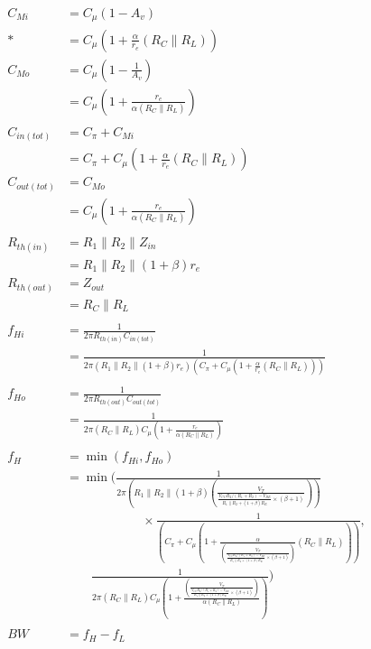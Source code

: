 \documentclass[11pt, a4paper]{article}
\begin{document}
\begin{align*}
C_{Mi} &= C_\mu (1 - A_v)\\*
&= C_\mu \left(1 + \frac{\alpha}{r_e}(R_C \parallel R_L)\right)\\
C_{Mo} &= C_\mu \left(1 - \frac{1}{A_v}\right)\\
&= C_\mu \left(1 + \frac{r_e}{\alpha(R_C \parallel R_L)}\right)\\ \\
C_{in(tot)} &= C_\pi + C_{Mi}\\
&= C_\pi + C_\mu \left(1 + \frac{\alpha}{r_e}(R_C \parallel R_L)\right)\\
C_{out(tot)} &= C_{Mo}\\
&= C_\mu \left(1 + \frac{r_e}{\alpha(R_C \parallel R_L)}\right)\\ \\
R_{th(in)} &= R_1 \parallel R_2 \parallel Z_{in}\\
&= R_1 \parallel R_2 \parallel (1+\beta)r_e\\
R_{th(out)} &= Z_{out}\\
&= R_C \parallel R_L\\ \\
f_{Hi} &= \frac{1}{2\pi R_{th(in)} C_{in(tot)}}\\
&= \frac{1}{2\pi (R_1 \parallel R_2 \parallel (1+\beta)r_e) \left(C_\pi + C_\mu \left(1 + \frac{\alpha}{r_e}(R_C \parallel R_L)\right)\right)}\\ \\
f_{Ho} &= \frac{1}{2\pi R_{th(out)} C_{out(tot)}}\\
&= \frac{1}{2\pi (R_C \parallel R_L) C_\mu \left(1 + \frac{r_e}{\alpha(R_C \parallel R_L)}\right)}\\ \\
f_H &= \min(f_{Hi}, f_{Ho})\\
&= \min\Bigg(
    \frac{1}{2\pi (R_1 \parallel R_2 \parallel (1+\beta)(\frac{V_T}{\frac{V_{CC}R_2/(R_1+R_2)-V_{BE}}{R_1 \parallel R_2 + (1+\beta)R_E} \times (\beta + 1)}))} \\
&\qquad\qquad\qquad \times \frac{1}{\left(C_\pi + C_\mu \left(1 + \frac{\alpha}{(\frac{V_T}{\frac{V_{CC}R_2/(R_1+R_2)-V_{BE}}{R_1 \parallel R_2 + (1+\beta)R_E} \times (\beta + 1)})}(R_C \parallel R_L)\right)\right)}, \\
&\qquad \frac{1}{2\pi (R_C \parallel R_L) C_\mu \left(1 + \frac{(\frac{V_T}{\frac{V_{CC}R_2/(R_1+R_2)-V_{BE}}{R_1 \parallel R_2 + (1+\beta)R_E} \times (\beta + 1)})}{\alpha(R_C \parallel R_L)}\right)}
\Bigg) \\ \\
BW &= f_H - f_L\\

\end{align*}
\end{document}
